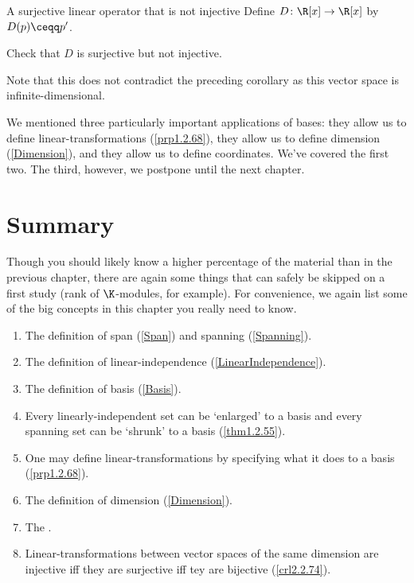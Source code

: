 \begin{exm}{A surjective linear operator that is not injective}{}
	Define $D\colon \R [x]\rightarrow \R [x]$ by $D(p)\ceqq p'$.
	\begin{exr}[breakable=false]{}{}
		Check that $D$ is surjective but not injective.
		\begin{rmk}
			Note that this does not contradict the preceding corollary as this vector space is infinite-dimensional.
		\end{rmk}
	\end{exr}
\end{exm}

We mentioned three particularly important applications of bases:  they allow us to define linear-transformations (\cref{prp1.2.68}), they allow us to define dimension (\cref{Dimension}), and they allow us to define coordinates.  We've covered the first two.  The third, however, we postpone until the next chapter.

\section{Summary}

Though you should likely know a higher percentage of the material than in the previous chapter, there are again some things that can safely be skipped on a first study (rank of $\K$-modules, for example).  For convenience, we again list some of the big concepts in this chapter you really need to know.
\begin{enumerate}
	\item The definition of span (\cref{Span}) and spanning (\cref{Spanning}).
	\item The definition of linear-independence (\cref{LinearIndependence}).
	\item The definition of basis (\cref{Basis}).
	\item Every linearly-independent set can be `enlarged' to a basis and every spanning set can be `shrunk' to a basis (\cref{thm1.2.55}).
	\item One may define linear-transformations by specifying what it does to a basis (\cref{prp1.2.68}).
	\item The definition of dimension (\cref{Dimension}).
	\item The .
	\item Linear-transformations between vector spaces of the same dimension are injective iff they are surjective iff tey are bijective (\cref{crl2.2.74}).
\end{enumerate}